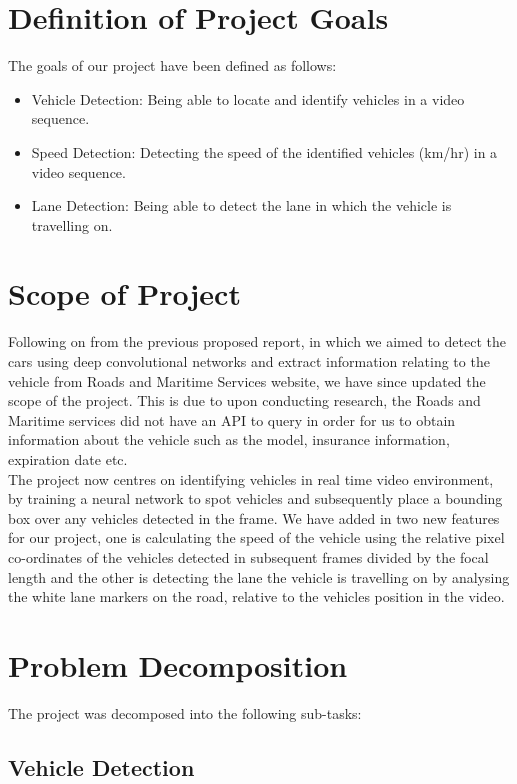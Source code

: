 \documentclass[conference]{IEEEtran}
\begin{document}
\section{Definition of Project Goals}

The goals of our project have been defined as follows:
\begin{itemize}
  \item Vehicle Detection: Being able to locate and identify vehicles in a video sequence.
  \item Speed Detection: Detecting the speed of the identified vehicles (km/hr) in a video sequence.
  \item Lane Detection: Being able to detect the lane in which the vehicle is travelling on. 
\end{itemize}

\section{Scope of Project}

Following on from the previous proposed report, in which we aimed to detect the cars using deep convolutional networks and extract information relating to the vehicle from Roads and Maritime Services website, we have since updated the scope of the project. This is due to upon conducting research, the Roads and Maritime services did not have an API to query in order for us to obtain information about the vehicle such as the model, insurance information, expiration date etc. \\

The project now centres on identifying vehicles in real time video environment, by training a neural network to spot vehicles and subsequently place a bounding box over any vehicles detected in the frame. We have added in two new features for our project, one is calculating the speed of the vehicle using the relative pixel co-ordinates of the vehicles detected in subsequent frames divided by the focal length and the other is detecting the lane the vehicle is travelling on by analysing the white lane markers on the road, relative to the vehicles position in the video. \\

\section{Problem Decomposition}
The project was decomposed into the following sub-tasks: 

\subsection{Vehicle Detection}\label{A}
\end{document}
